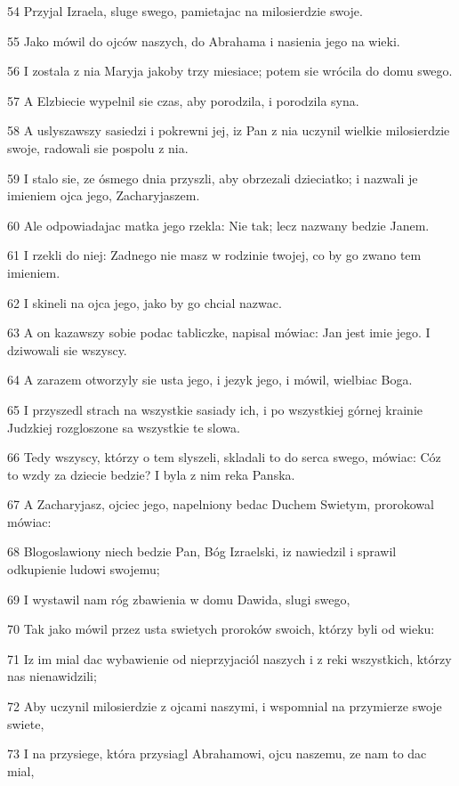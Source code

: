 \par 54 Przyjal Izraela, sluge swego, pamietajac na milosierdzie swoje.
\par 55 Jako mówil do ojców naszych, do Abrahama i nasienia jego na wieki.
\par 56 I zostala z nia Maryja jakoby trzy miesiace; potem sie wrócila do domu swego.
\par 57 A Elzbiecie wypelnil sie czas, aby porodzila, i porodzila syna.
\par 58 A uslyszawszy sasiedzi i pokrewni jej, iz Pan z nia uczynil wielkie milosierdzie swoje, radowali sie pospolu z nia.
\par 59 I stalo sie, ze ósmego dnia przyszli, aby obrzezali dzieciatko; i nazwali je imieniem ojca jego, Zacharyjaszem.
\par 60 Ale odpowiadajac matka jego rzekla: Nie tak; lecz nazwany bedzie Janem.
\par 61 I rzekli do niej: Zadnego nie masz w rodzinie twojej, co by go zwano tem imieniem.
\par 62 I skineli na ojca jego, jako by go chcial nazwac.
\par 63 A on kazawszy sobie podac tabliczke, napisal mówiac: Jan jest imie jego. I dziwowali sie wszyscy.
\par 64 A zarazem otworzyly sie usta jego, i jezyk jego, i mówil, wielbiac Boga.
\par 65 I przyszedl strach na wszystkie sasiady ich, i po wszystkiej górnej krainie Judzkiej rozgloszone sa wszystkie te slowa.
\par 66 Tedy wszyscy, którzy o tem slyszeli, skladali to do serca swego, mówiac: Cóz to wzdy za dziecie bedzie? I byla z nim reka Panska.
\par 67 A Zacharyjasz, ojciec jego, napelniony bedac Duchem Swietym, prorokowal mówiac:
\par 68 Blogoslawiony niech bedzie Pan, Bóg Izraelski, iz nawiedzil i sprawil odkupienie ludowi swojemu;
\par 69 I wystawil nam róg zbawienia w domu Dawida, slugi swego,
\par 70 Tak jako mówil przez usta swietych proroków swoich, którzy byli od wieku:
\par 71 Iz im mial dac wybawienie od nieprzyjaciól naszych i z reki wszystkich, którzy nas nienawidzili;
\par 72 Aby uczynil milosierdzie z ojcami naszymi, i wspomnial na przymierze swoje swiete,
\par 73 I na przysiege, która przysiagl Abrahamowi, ojcu naszemu, ze nam to dac mial,
